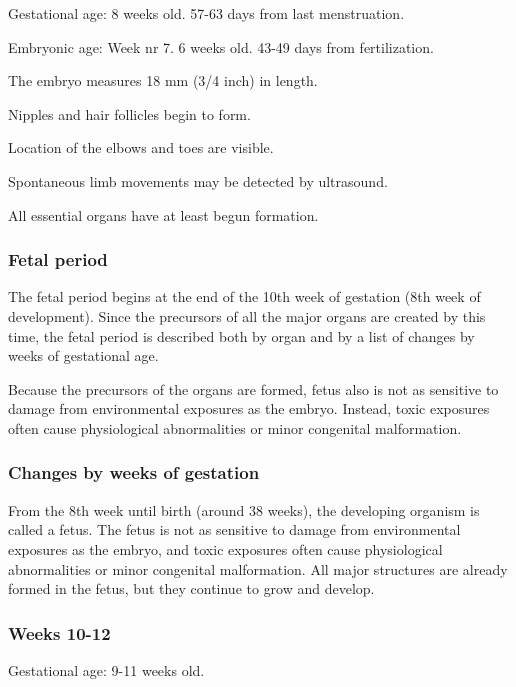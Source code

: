\documentclass[12pt,a4paper,onecolumn]{article}
\begin{document}
Gestational age: 8 weeks old. 57-63 days from last menstruation.

Embryonic age: Week nr 7. 6 weeks old. 43-49 days from fertilization.

\begin{wuxch_item}
    \item The embryo measures 18 mm (3/4 inch) in length.
    \item Nipples and hair follicles begin to form.
    \item Location of the elbows and toes are visible.
    \item Spontaneous limb movements may be detected by ultrasound.
    \item All essential organs have at least begun formation.
\end{wuxch_item}

\subsubsection{Fetal period}

The fetal period begins at the end of the 10th week of gestation (8th week of development). Since
the precursors of all the major organs are created by this time, the fetal period is described both
by organ and by a list of changes by weeks of gestational age.

Because the precursors of the organs are formed, fetus also is not as sensitive to damage from
environmental exposures as the embryo. Instead, toxic exposures often cause physiological
abnormalities or minor congenital malformation.

\subsubsection{Changes by weeks of gestation}

From the 8th week until birth (around 38 weeks), the developing organism is called a fetus. The
fetus is not as sensitive to damage from environmental exposures as the embryo, and toxic exposures
often cause physiological abnormalities or minor congenital malformation. All major structures are
already formed in the fetus, but they continue to grow and develop.

\subsubsection{Weeks 10-12}

Gestational age: 9-11 weeks old.
\end{document}
